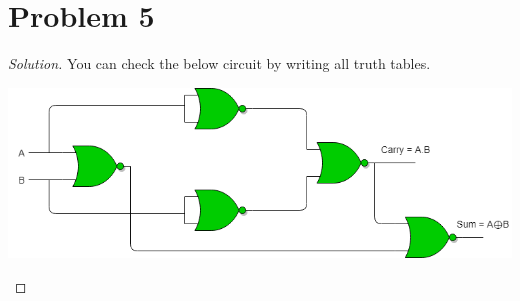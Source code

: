 \section*{Problem 5}
	\begin{proof} [Solution]
		You can check the below circuit by writing all truth tables.
		\begin{center}
			\includegraphics[width=\textwidth]{NOR.png}
		\end{center}
	\end{proof}